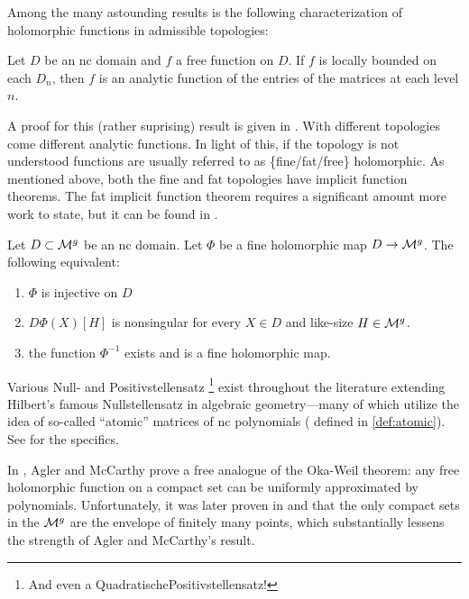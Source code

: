 Among the many astounding results is the following characterization of
holomorphic functions in admissible topologies:
\begin{theorem}
  Let \(D\) be an nc domain and \(f\) a free function on \(D\). If \(f\) is
  locally bounded on each \(D_n\), then \(f\) is an analytic function of the
  entries of the matrices at each level \(n\).
\end{theorem}
A proof for this (rather suprising) result is given in \cite{aglerAspects2016}.
With different topologies come different analytic functions. In light of this,
if the topology is not understood functions are usually referred to as
\{fine/fat/free\} holomorphic.
As mentioned above, both the fine and fat topologies have implicit function
theorems. The fat implicit function theorem requires a significant amount more
work to state, but it can be found in \cite{aglerOperator2019}.
\begin{theorem}
  Let \(D \subset \mathcal{M}^g\) be an nc domain. Let \(\Phi\) be a fine holomorphic
  map \(D\to \mathcal{M}^{g} \). The following equivalent:
  \begin{enumerate}
    \item \(\Phi\) is injective on \(D\)
    \item \(D\Phi(X)[H]\) is nonsingular for every \(X \in D\) and like-size
          \(H \in \mathcal{M}^{g}\).
    \item the function \(\Phi ^{-1}\) exists and is a fine holomorphic
          map.
  \end{enumerate}
\end{theorem}

Various Null- and Positivstellensatz
\footnote{And even a QuadratischePositivstellensatz!} exist throughout the
literature extending Hilbert's famous Nullstellensatz in algebraic
geometry---many of which utilize the idea of so-called ``atomic'' matrices of nc
polynomials ({\color{red} defined in }\ref{def:atomic}). See \cite{heltonFactorization2019}
for the specifics.

In \cite{aglerGlobal2013}, Agler and McCarthy prove a free analogue of the
Oka-Weil theorem: any free holomorphic function on a compact set
can be uniformly approximated by polynomials. Unfortunately, it was later proven
in \cite{pascoeInvariant2021} and \cite{augatCompact2017} that the only compact
sets in the \(\mathcal{M}^{g} \) are the envelope of finitely many points, which
substantially lessens the strength of
Agler and McCarthy's result.



